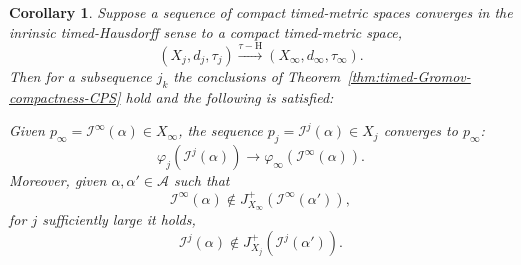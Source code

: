 \documentclass[a4paper,12pt,reqno]{amsart}
\theoremstyle{plain}
\newtheorem{cor}[thm]{Corollary}
\newcommand{\tHto}{\stackrel { \tau-\textrm{H}}{\longrightarrow} }
\newcommand{\be}{\begin{equation}}
\newcommand{\ee}{\end{equation}}
\begin{document}
\begin{cor}\label{cor:CausalSeqWithAddressesItem2}
Suppose a sequence of compact 
timed-metric spaces converges 
in the inrinsic timed-Hausdorff sense to a compact timed-metric space,
\be
(X_j,d_j,\tau_j)\tHto
(X_\infty,d_\infty,\tau_\infty).
\ee
Then for a subsequence $j_k$
the conclusions of Theorem~\ref{thm:timed-Gromov-compactness-CPS}
hold and the following is satisfied:


\medskip



Given $p_\infty=\mathcal{I}^{\infty}(\alpha) \in X_\infty$, the sequence
$p_j=\mathcal{I}^{j}(\alpha)\in X_j$ converges to $p_\infty$:
\[
\varphi_j( \mathcal{I}^{j}(\alpha)  )\to \varphi_\infty(\mathcal{I}^{\infty}(\alpha)).
\]
Moreover, given $\alpha,\alpha'\in \mathcal{A}$ such that 
\be
\mathcal{I}^{\infty}(\alpha) \notin J^+_{X_{\infty}}(\mathcal{I}^{\infty}(\alpha')),
\ee
for $j$ sufficiently large it holds, 
\be
\mathcal{I}^j(\alpha) \notin J^+_{X_j}(\mathcal{I}^j(\alpha')).
\ee
\end{cor}
\end{document}
